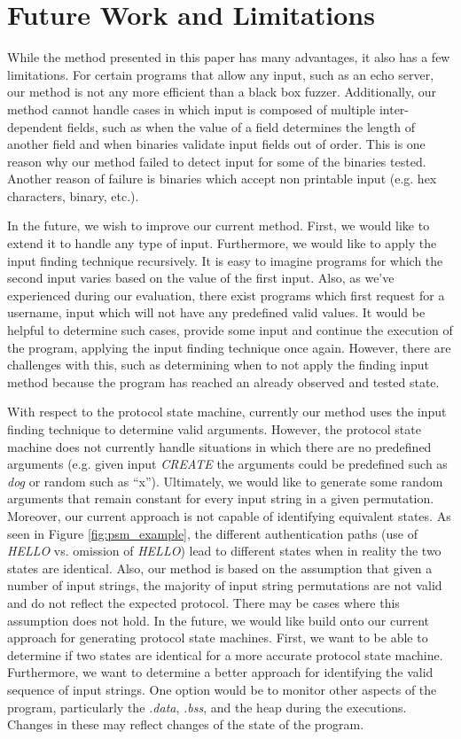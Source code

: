 \documentclass{acm_proc_article-sp}
\begin{document}
\section{Future Work and Limitations} \label{futurework}
While the method presented in this paper has many advantages, it also has a few limitations.
For certain programs that allow any input, such as an echo server, our method is not any more efficient than a black box fuzzer.
Additionally, our method cannot handle cases in which input is composed of multiple inter-dependent fields, such as when the value of a field determines the length of another field and when binaries validate input fields out of order.
This is one reason why our method failed to detect input for some of the binaries tested.
Another reason of failure is binaries which accept non printable input (e.g. hex characters, binary, etc.).

In the future, we wish to improve our current method.
First, we would like to extend it to handle any type of input.
Furthermore, we would like to apply the input finding technique recursively.
It is easy to imagine programs for which the second input varies based on the value of the first input.
Also, as we've experienced during our evaluation, there exist programs which first request for a username, input which will not have any predefined valid values.
It would be helpful to determine such cases, provide some input and continue the execution of the program, applying the input finding technique once again.
However, there are challenges with this, such as determining when to not apply the finding input method because the program has reached an already observed and tested state.

With respect to the protocol state machine, currently our method uses the input finding technique to determine valid arguments.
However, the protocol state machine does not currently handle situations in which there are no predefined arguments (e.g. given input \textit{CREATE} the arguments could be predefined such as \textit{dog} or random such as ``x'').
Ultimately, we would like to generate some random arguments that remain constant for every input string in a given permutation.
Moreover, our current approach is not capable of identifying equivalent states. As seen in Figure \ref{fig:psm_example}, the different authentication paths (use of \textit{HELLO} vs. omission of \textit{HELLO}) lead to different states when in reality the two states are identical.
Also, our method is based on the assumption that given a number of input strings, the majority of input string permutations are not valid and do not reflect the expected protocol.
There may be cases where this assumption does not hold.
In the future, we would like build onto our current approach for generating protocol state machines. 
First, we want to be able to determine if two states are identical for a more accurate protocol state machine.
Furthermore, we want to determine a better approach for identifying the valid sequence of input strings.
One option would be to monitor other aspects of the program, particularly the \textit{.data}, \textit{.bss}, and the heap during the executions.
Changes in these may reflect changes of the state of the program.
\end{document}

